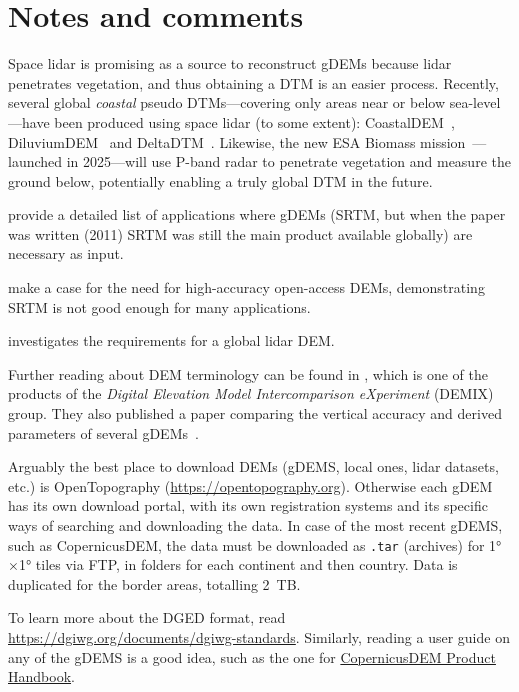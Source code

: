 %
\section{Notes and comments}

Space lidar is promising as a source to reconstruct gDEMs because lidar penetrates vegetation, and thus obtaining a DTM is an easier process.
Recently, several global \emph{coastal} pseudo DTMs---covering only areas near or below sea-level---have been produced using space lidar (to some extent): CoastalDEM~\citep{Kulp24}, DiluviumDEM~\citep{Dusseau23} and DeltaDTM~\citep{Pronk24}.
Likewise, the new ESA Biomass mission~\citep{quegan2019}---launched in 2025---will use P-band radar to penetrate vegetation and measure the ground below, potentially enabling a truly global DTM in the future.

\citet{Yang11} provide a detailed list of applications where gDEMs (SRTM, but when the paper was written (2011) SRTM was still the main product available globally) are necessary as input.

\citet{Schumann2018} make a case for the need for high-accuracy open-access DEMs, demonstrating SRTM is not good enough for many applications.

\citet{Hancock2021} investigates the requirements for a global lidar DEM\@.

Further reading about DEM terminology can be found in \citet{Guth2021}, which is one of the products of the \emph{Digital Elevation Model Intercomparison eXperiment} (DEMIX) group.
They also published a paper comparing the vertical accuracy and derived parameters of several gDEMs~\citep{guthRanking10Global2024}.

Arguably the best place to download DEMs (gDEMS, local ones, lidar datasets, etc.) is OpenTopography (\url{https://opentopography.org}).
Otherwise each gDEM has its own download portal, with its own registration systems and its specific ways of searching and downloading the data.
In case of the most recent gDEMS, such as CopernicusDEM, the data must be downloaded as \texttt{.tar} (archives) for \ang{1}$\times$\ang{1} tiles via FTP, in folders for each continent and then country.
Data is duplicated for the border areas, totalling \qty{2}{TB}.

To learn more about the DGED format, read \url{https://dgiwg.org/documents/dgiwg-standards}.
Similarly, reading a user guide on any of the gDEMS is a good idea, such as the one for \href{https://spacedata.copernicus.eu/documents/20126/0/GEO1988-CopernicusDEM-SPE-002_ProductHandbook_I3.0+%281%29.pdf}{CopernicusDEM Product Handbook}.

